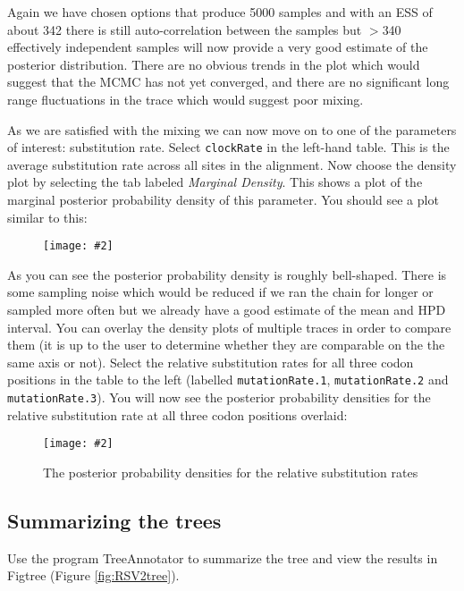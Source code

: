 \documentclass[12pt]{article}
\newcommand{\includeimage}[2][]{%
\texttt{[image: \#2]}
}
\begin{document}
Again we have chosen options that produce 5000 samples and with an ESS of about 342 there is still auto-correlation
between the samples but $>$340 effectively independent samples will now provide a very good estimate of the posterior distribution.
There are no obvious trends in the plot which would suggest that the MCMC has not yet converged, and there are no significant long range 
fluctuations in the trace which would suggest poor mixing.

As we are satisfied with the mixing we can now move on to one of the parameters of interest:
substitution rate. Select \texttt{clockRate} in the left-hand table. This is the average substitution rate across all sites in the
alignment. Now choose the density plot by selecting the tab labeled {\it Marginal Density}. This shows a plot of the marginal posterior probability
density of this parameter. You should see a plot similar to this:

\begin{figure}
\centering	
\includeimage[width=0.8\textwidth]{figures/Tracer_density}
\label{fig:Tracer_density}
\end{figure}

As you can see the posterior probability density is roughly bell-shaped. There is some sampling noise which would be
reduced if we ran the chain for longer or sampled more often but we already have a good estimate of the mean and HPD interval. You can overlay
the density plots of multiple traces in order to compare them (it is up to the user to determine whether they are comparable on the the same axis or not). Select the relative substitution rates for all three codon positions in the table to the left (labelled
\texttt{mutationRate.1}, \texttt{mutationRate.2} and \texttt{mutationRate.3}). You will now see the posterior probability densities for the relative
substitution rate at all three codon positions overlaid:

\begin{figure}
\centering	
\includeimage[width=0.8\textwidth]{figures/Tracer_relativeRates}
\label{fig:Tracer_relativeRates}
\caption{The posterior probability densities for the relative substitution rates}
\end{figure}

\subsection*{Summarizing the trees}

Use the program TreeAnnotator to summarize the tree and view the results in Figtree (Figure \ref{fig:RSV2tree}).
\end{document}

